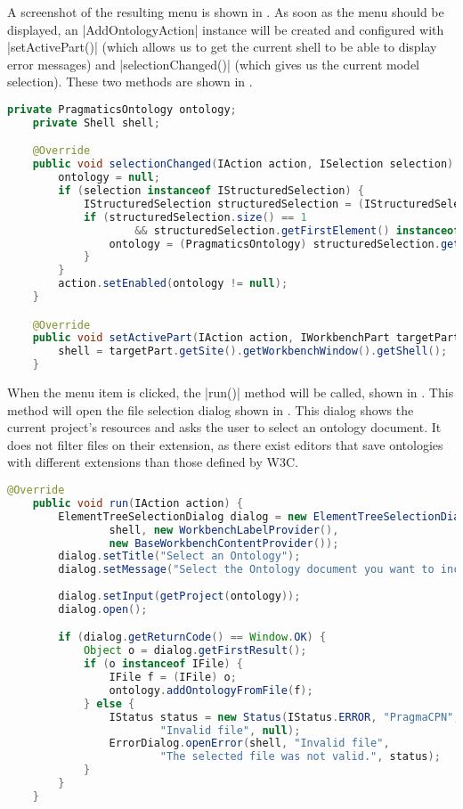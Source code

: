A screenshot of the resulting menu is shown in . As soon
as the menu should be displayed, an |AddOntologyAction| instance will be created
and configured with |setActivePart()| (which allows us to
get the current shell to be able to display error messages)
and |selectionChanged()| (which gives us the current model selection). These two
methods are shown in .


\begin{lstlisting}[language=Java,float,label=lst:AddOntologyAction_config,
caption=AddOntologyAction setActivePart() and selectionChanged()]
	private PragmaticsOntology ontology;
	private Shell shell;

	@Override
	public void selectionChanged(IAction action, ISelection selection) {
		ontology = null;
		if (selection instanceof IStructuredSelection) {
			IStructuredSelection structuredSelection = (IStructuredSelection) selection;
			if (structuredSelection.size() == 1
					&& structuredSelection.getFirstElement() instanceof PragmaticsOntology) {
				ontology = (PragmaticsOntology) structuredSelection.getFirstElement();
			}
		}
		action.setEnabled(ontology != null);
	}

	@Override
	public void setActivePart(IAction action, IWorkbenchPart targetPart) {
		shell = targetPart.getSite().getWorkbenchWindow().getShell();
	}
\end{lstlisting}

When the menu item is clicked, the |run()| method will be called, shown in
. This method will open the file selection dialog
shown in . This dialog shows the current project's
resources and asks the user to select an ontology document. It does not filter
files on their extension, as there exist editors that save ontologies with
different extensions than those defined by W3C.

\begin{lstlisting}[language=Java,float,label=lst:AddOntologyAction_run,
caption=AddOntologyAction run()]
	@Override
	public void run(IAction action) {
		ElementTreeSelectionDialog dialog = new ElementTreeSelectionDialog(
				shell, new WorkbenchLabelProvider(),
				new BaseWorkbenchContentProvider());
		dialog.setTitle("Select an Ontology");
		dialog.setMessage("Select the Ontology document you want to include in the net:");
		
		dialog.setInput(getProject(ontology));
		dialog.open();

		if (dialog.getReturnCode() == Window.OK) {
			Object o = dialog.getFirstResult();
			if (o instanceof IFile) {
				IFile f = (IFile) o;
				ontology.addOntologyFromFile(f);
			} else {
				IStatus status = new Status(IStatus.ERROR, "PragmaCPN", 0,
						"Invalid file", null);
				ErrorDialog.openError(shell, "Invalid file",
						"The selected file was not valid.", status);
			}
		}
	}
\end{lstlisting}

